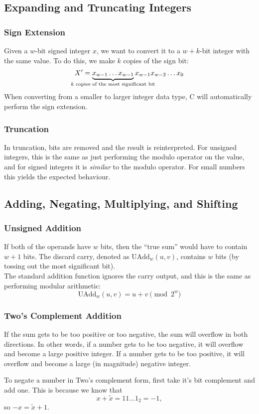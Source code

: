 \documentclass[class=article, crop=false]{standalone}
\begin{document}
  \subsection{Expanding and Truncating Integers}
  \subsubsection{Sign Extension}
  Given a $w$-bit signed integer $x$, we want to convert it to a $w+k$-bit integer with the same value. To do this, we make $k$ copies of the sign bit:
  \[
    X' = \underbrace{x_{w-1}\ldots x_{w-1}}_{\mathclap{\text{$k$ copies of the most significant bit}}}x_{w-1}x_{w-2}\ldots x_0
  \]
  When converting from a smaller to larger integer data type, C will automatically perform the sign extension.
  \subsubsection{Truncation}
  In truncation, bits are removed and the result is reinterpreted. For unsigned integers, this is the same as just performing the modulo operator on the value, and for signed integers it is \emph{similar} to the modulo operator. For small numbers this yields the expected behaviour.
  \subsection{Adding, Negating, Multiplying, and Shifting}
  \subsubsection{Unsigned Addition}
  If both of the operands have $w$ bits, then the ``true sum'' would have to contain $w+1$ bits. The discard carry, denoted as $\mathrm{UAdd}_w(u, v)$, contains $w$ bits (by tossing out the most significant bit). \\[10pt]
  The standard addition function ignores the carry output, and this is the same as performing modular arithmetic:
  \[
    \mathrm{UAdd}_w(u, v) = u + v \pmod{2^w}
  \]
  \subsubsection{Two's Complement Addition}
  If the sum gets to be too positive or too negative, the sum will overflow in both directions. In other words, if a number gets to be too negative, it will overflow and become a large positive integer. If a number gets to be too positive, it will overflow and become a large (in magnitude) negative integer.
  \begin{note}{}
    To negate a number in Two's complement form, first take it's bit complement and add one. This is because we know that
    \[
      x + \tilde x = 11\ldots 1_2 = -1,
    \]
    so $-x = \tilde x + 1$.
  \end{note}
\end{document}
